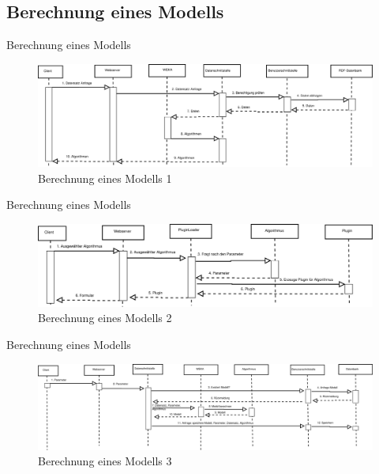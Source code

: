\documentclass{beamer}
\begin{document}
		\subsection[Berechnung]{Berechnung eines Modells}
		\begin{frame}{Berechnung eines Modells}	
			\begin{figure}
				\centering
				\includegraphics[width=\linewidth]{../Grafik/Diagramm/Szenarios/Berechnung}
				\caption{Berechnung eines Modells 1}
				\label{fig:Berechnung1}
			\end{figure}
		\end{frame}
		\begin{frame}{Berechnung eines Modells}	
			\begin{figure}
				\centering
				\includegraphics[width=\linewidth]{../Grafik/Diagramm/Szenarios/Berechnung2}
				\caption{Berechnung eines Modells 2}
				\label{fig:Berechnung2}
			\end{figure}
		\end{frame}
		\begin{frame}{Berechnung eines Modells}	
			\begin{figure}
				\centering
				\includegraphics[width=\linewidth]{../Grafik/Diagramm/Szenarios/Berechnung3}
				\caption{Berechnung eines Modells 3}
				\label{fig:Berechnung3}
			\end{figure}
		\end{frame}	
		
\end{document}

